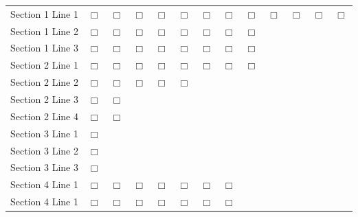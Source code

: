 \begin{tabular}{lcccccccccccc}

Section 1 Line 1 & $\Box$ & $\Box$ & $\Box$ & $\Box$ & $\Box$ & $\Box$ & $\Box$ & $\Box$ & $\Box$ & $\Box$ & $\Box$ & $\Box$ \\
Section 1 Line 2 & $\Box$ & $\Box$ & $\Box$ & $\Box$ & $\Box$ & $\Box$ & $\Box$ & $\Box$ & & & & \\
Section 1 Line 3 & $\Box$ & $\Box$ & $\Box$ & $\Box$ & $\Box$ & $\Box$ & $\Box$ & $\Box$ & & & & \\

\midrule

Section 2 Line 1 & $\Box$ & $\Box$ & $\Box$ & $\Box$ & $\Box$ & $\Box$ & $\Box$ & $\Box$ & & & \\
Section 2 Line 2 & $\Box$ & $\Box$ & $\Box$ & $\Box$ & $\Box$ & & & & & & & \\
Section 2 Line 3 & $\Box$ & $\Box$ & & & & & & & & & & \\
Section 2 Line 4 & $\Box$ & $\Box$ & & & & & & & & & & \\

\midrule

Section 3 Line 1 & $\Box$ & & & & & & & & & & & \\
Section 3 Line 2 & $\Box$ & & & & & & & & & & & \\
Section 3 Line 3 & $\Box$ & & & & & & & & & & & \\

\midrule

Section 4 Line 1 & $\Box$ & $\Box$ & $\Box$ & $\Box$ & $\Box$ & $\Box$ & $\Box$ & & & & & \\
Section 4 Line 1 & $\Box$ & $\Box$ & $\Box$ & $\Box$ & $\Box$ & $\Box$ & $\Box$ & & & & & \\

\end{tabular}